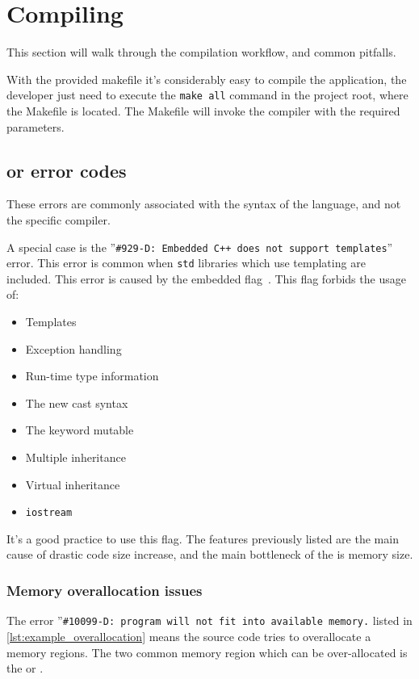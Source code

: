 \section{Compiling}

This section will walk through the compilation workflow, and common pitfalls.

With the provided makefile it's considerably easy to compile the application, the developer just need to execute the \verb|make all| command in the project root, where the Makefile is located. The Makefile will invoke the compiler with the required parameters.

\subsection{\cpl{} or \cpp{} error codes}

These errors are commonly associated with the syntax of the language, and not the specific compiler.

A special case is the ''\verb|#929-D: Embedded C++ does not support templates|'' error. This error is common when \verb+std+ libraries which use templating are included. This error is caused by the embedded \cpp{} flag~\cite[Section 5.13.4]{PRU_C_CPP}. This flag forbids the usage of:
\begin{itemize}
	\item Templates
	\item Exception handling
	\item Run-time type information
	\item The new cast syntax
	\item The keyword mutable
	\item Multiple inheritance
	\item Virtual inheritance
	\item \verb|iostream|
\end{itemize}

It's a good practice to use this flag. The features previously listed are the main cause of drastic code size increase, and the main bottleneck of the \pru{} is memory size.

\subsubsection{Memory overallocation issues}

The error ''\verb|#10099-D: program will not fit into available memory.| listed in \cref{lst:example_overallocation} means the source code tries to overallocate a memory regions. The two common memory region which can be over-allocated is the \iram{} or \dram{}.

